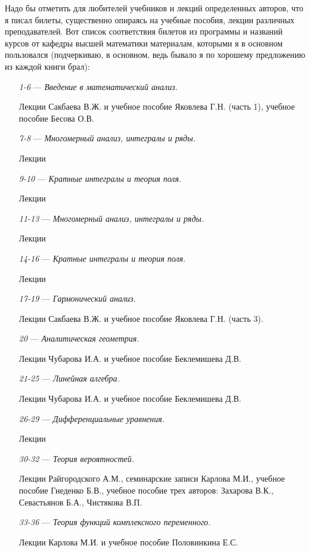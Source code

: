 Надо бы отметить для любителей учебников и лекций определенных авторов, что я писал билеты, существенно опираясь на учебные пособия, лекции различных преподавателей. Вот список соответствия билетов из программы и названий курсов от кафедры высшей математики материалам, которыми я в основном пользовался (подчеркиваю, в основном, ведь бывало я по хорошему предложению из каждой книги брал):
\begin{itemize}
\item[\textit{1-6}]
\; --- \: \textit{Введение в математический анализ.} 

Лекции Сакбаева В.Ж. и учебное пособие Яковлева Г.Н. (часть 1), учебное пособие Бесова О.В.
\item[\textit{7-8}] 
\; --- \: \textit{Многомерный анализ, интегралы и ряды.}

Лекции
\item[\textit{9-10}] 
\; --- \: \textit{Кратные интегралы и теория поля.}

Лекции
\item[\textit{11-13}] 
\; --- \: \textit{Многомерный анализ, интегралы и ряды.}

Лекции
\item[\textit{14-16}] 
\; --- \: \textit{Кратные интегралы и теория поля.}

Лекции
\item[\textit{17-19}] 
\; --- \: \textit{Гармонический анализ.}

Лекции Сакбаева В.Ж. и учебное пособие Яковлева Г.Н. (часть 3).
\item[\textit{20}] 
\; --- \: \textit{Аналитическая геометрия.}

Лекции Чубарова И.А. и учебное пособие Беклемишева Д.В.
\item[\textit{21-25}] 
\; --- \: \textit{Линейная алгебра.}

Лекции Чубарова И.А. и учебное пособие Беклемишева Д.В.
\item[\textit{26-29}] 
\; --- \: \textit{Дифференциальные уравнения.}

Лекции
\item[\textit{30-32}]
\; --- \: \textit{Теория вероятностей.}

Лекции Райгородского А.М., семинарские записи Карлова М.И., учебное пособие Гнеденко Б.В., учебное пособие трех авторов: Захарова В.К., Севастьянов Б.А., Чистякова В.П.
\item[\textit{33-36}]
\; --- \: \textit{Теория функций комплексного переменного.}

Лекции Карлова М.И. и учебное пособие Половинкина Е.С.
\end{itemize}


